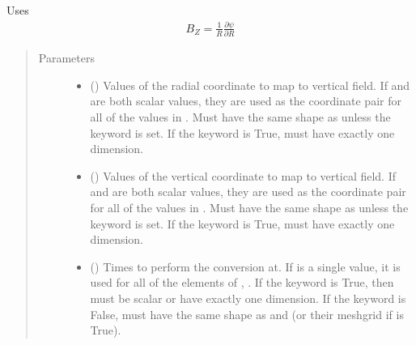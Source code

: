 \documentclass[letterpaper,10pt,english]{sphinxmanual}
\begin{document}
\begin{fulllineitems}
\begin{fulllineitems}
Uses
\begin{equation*}
\begin{split}B_Z = \frac{1}{R}\frac{\partial \psi}{\partial R}\end{split}
\end{equation*}\begin{quote}\begin{description}
\item[{Parameters}] \leavevmode\begin{itemize}
\item {} 
 () \textendash{} Values of the radial coordinate to
map to vertical field. If  and  are both scalar values,
they are used as the coordinate pair for all of the values in
. Must have the same shape as  unless the 
keyword is set. If the  keyword is True,  must
have exactly one dimension.

\item {} 
 () \textendash{} Values of the vertical coordinate to
map to vertical field. If  and  are both scalar values,
they are used as the coordinate pair for all of the values in
. Must have the same shape as  unless the 
keyword is set. If the  keyword is True,  must
have exactly one dimension.

\item {} 
 () \textendash{} Times to perform the conversion at.
If  is a single value, it is used for all of the elements of
, . If the  keyword is True, then  must be
scalar or have exactly one dimension. If the  keyword is
False,  must have the same shape as  and  (or their
meshgrid if  is True).


\end{itemize}
\end{description}
\end{quote}
\end{fulllineitems}
\end{fulllineitems}
\end{document}
